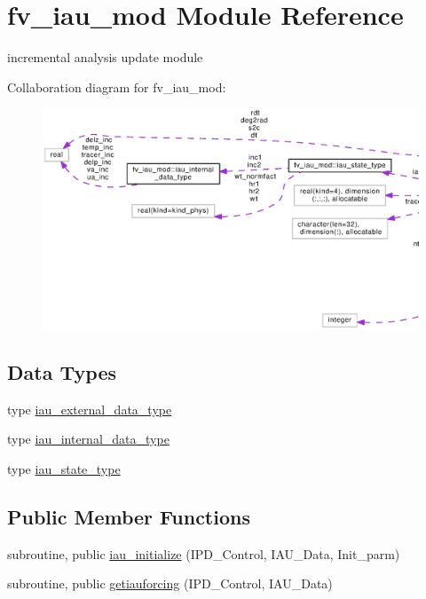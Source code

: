 \section{fv\-\_\-iau\-\_\-mod Module Reference}
\label{classfv__iau__mod}


incremental analysis update module  




Collaboration diagram for fv\-\_\-iau\-\_\-mod\-:
\nopagebreak
\begin{figure}[H]
\begin{center}
\leavevmode
\includegraphics[width=350pt]{classfv__iau__mod__coll__graph}
\end{center}
\end{figure}
\subsection*{Data Types}
\begin{DoxyCompactItemize}
\item 
type \hyperlink{structfv__iau__mod_1_1iau__external__data__type}{iau\-\_\-external\-\_\-data\-\_\-type}
\item 
type \hyperlink{structfv__iau__mod_1_1iau__internal__data__type}{iau\-\_\-internal\-\_\-data\-\_\-type}
\item 
type \hyperlink{structfv__iau__mod_1_1iau__state__type}{iau\-\_\-state\-\_\-type}
\end{DoxyCompactItemize}
\subsection*{Public Member Functions}
\begin{DoxyCompactItemize}
\item 
subroutine, public \hyperlink{classfv__iau__mod_a4caa0c7cbde506ddfd85fb2a4cb17d31}{iau\-\_\-initialize} (I\-P\-D\-\_\-\-Control, I\-A\-U\-\_\-\-Data, Init\-\_\-parm)
\item 
subroutine, public \hyperlink{classfv__iau__mod_ae529ff05f683e363f03577449cc5e678}{getiauforcing} (I\-P\-D\-\_\-\-Control, I\-A\-U\-\_\-\-Data)
\end{DoxyCompactItemize}
